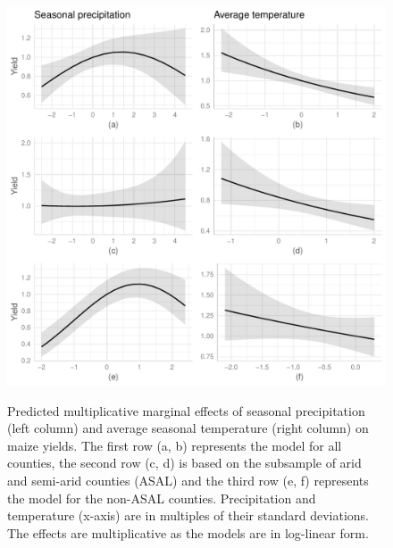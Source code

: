 \documentclass[12pt]{iopart}
\begin{document}
  \begin{figure}
   \includegraphics{Figure1a_1f.pdf}\label{MarEff1}
\caption{Predicted multiplicative marginal effects of seasonal precipitation (left column) and average seasonal temperature (right column) on maize yields. The first row (a, b) represents the model for all counties, the second row (c, d) is based on the subsample of arid and semi-arid counties (ASAL) and the third row (e, f) represents the model for the non-ASAL counties. Precipitation and temperature (x-axis) are in multiples of their standard deviations. The effects are multiplicative as the models are in log-linear form.}
\end{figure}
\end{document}

